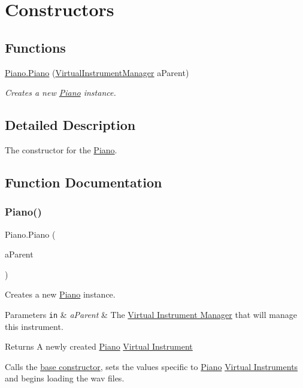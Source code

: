 \hypertarget{group___piano_construct}{}\section{Constructors}
\label{group___piano_construct}
\subsection*{Functions}
\begin{DoxyCompactItemize}
\item 
\hyperlink{group___piano_construct_ga5128747ca1a1fbdc94a78362d3b87eed}{Piano.\+Piano} (\hyperlink{class_virtual_instrument_manager}{Virtual\+Instrument\+Manager} a\+Parent)
\begin{DoxyCompactList}\small\item\em Creates a new \hyperlink{class_piano}{Piano} instance. \end{DoxyCompactList}\end{DoxyCompactItemize}


\subsection{Detailed Description}
The constructor for the \hyperlink{class_piano}{Piano}. 

\subsection{Function Documentation}
\mbox{\label{group___piano_construct_ga5128747ca1a1fbdc94a78362d3b87eed}} 
\subsubsection{\texorpdfstring{Piano()}{Piano()}}
{\footnotesize\ttfamily Piano.\+Piano (\begin{DoxyParamCaption}\item[{\hyperlink{class_virtual_instrument_manager}{Virtual\+Instrument\+Manager}}]{a\+Parent }\end{DoxyParamCaption})}



Creates a new \hyperlink{class_piano}{Piano} instance. 


\begin{DoxyParams}[1]{Parameters}
\mbox{\tt in}  & {\em a\+Parent} & The \hyperlink{group___v_i_m}{Virtual Instrument Manager} that will manage this instrument. \\
\hline
\end{DoxyParams}
\begin{DoxyReturn}{Returns}
A newly created \hyperlink{class_piano}{Piano} \hyperlink{group___v_i}{Virtual Instrument}
\end{DoxyReturn}
Calls the \hyperlink{group___v_i_base}{base constructor}, sets the values specific to \hyperlink{class_piano}{Piano} \hyperlink{group___v_i}{Virtual Instruments} and begins loading the wav files. 

